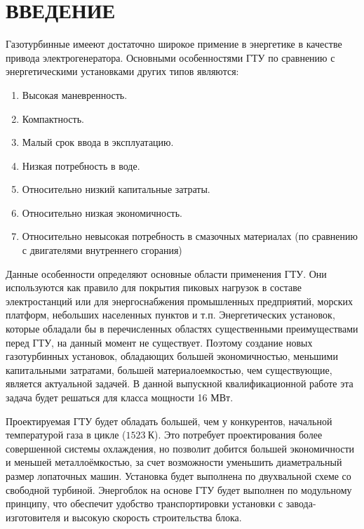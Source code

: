 \documentclass[a4paper,12pt]{article}
\begin{document}
    \section{ВВЕДЕНИЕ}
    Газотурбинные имееют достаточно широкое примение в энергетике в качестве привода электрогенератора.
    Основными особенностями ГТУ по сравнению с энергетическими установками других типов являются:
    \begin{enumerate}
        \item Высокая маневренность.
        \item Компактность.
        \item Малый срок ввода в эксплуатацию.
        \item Низкая потребность в воде.
        \item Относительно низкий капитальные затраты.
        \item Относительно низкая экономичность.
        \item Относительно невысокая потребность в смазочных материалах (по сравнению с двигателями
        внутреннего сгорания)
    \end{enumerate}
    Данные особенности определяют основные области применения ГТУ.
    Они используются как правило для покрытия пиковых нагрузок в составе электростанций или для
    энергоснабжения промышленных предприятий, морских платформ, небольших населенных пунктов и т.п.
    Энергетических установок, которые обладали бы в перечисленных областях существенными преимуществами перед ГТУ, на
    данный момент не существует.
    Поэтому создание новых газотурбинных установок, обладающих большей экономичностью,
    меньшими капитальными затратами, большей материалоемкостью, чем существующие, является актуальной задачей.
    В данной выпускной квалификационной работе эта задача будет решаться для класса мощности 16 МВт.

    Проектируемая ГТУ будет обладать большей, чем у конкурентов, начальной температурой газа в цикле
    ($ 1523\ К $).
    Это потребует проектирования более совершенной системы охлаждения, но позволит добится большей экономичности и
    меньшей металлоёмкостью, за счет возможности уменьшить диаметральный размер лопаточных машин.
    Установка будет выполнена по двухвальной схеме со свободной турбиной.
    Энергоблок на основе ГТУ будет выполнен по модульному принципу, что обеспечит удобство транспортировки установки с
    завода-изготовителя и высокую скорость строительства блока.

    \newpage
\end{document}
